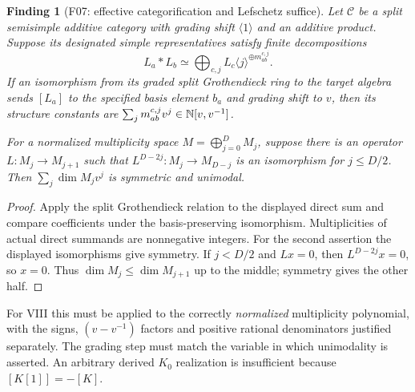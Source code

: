 \documentclass[11pt,a4paper]{article}
\newcommand{\mathscr}{\mathcal}
\newcommand{\fid}[1]{\textsf{#1}}\newcommand{\gate}[1]{\textsf{#1}}
\theoremstyle{named}\newtheorem{finding}{Finding}[section]
\theoremstyle{definition}\newtheorem{definition}[finding]{Definition}
\theoremstyle{remark}\newtheorem{remark}[finding]{Remark}
\begin{document}
\begin{finding}[\fid{F07}: effective categorification and Lefschetz suffice]\label{f:category}
Let $\mathscr C$ be a split semisimple additive category with grading shift $\langle1\rangle$ and an additive product. Suppose its designated simple representatives satisfy finite decompositions
\[
 L_a*L_b\simeq\bigoplus_{c,j}L_c\langle j\rangle^{\oplus m_{ab}^{c,j}}.
\]
If an isomorphism from its graded split Grothendieck ring to the target algebra sends $[L_a]$ to the \emph{specified} basis element $b_a$ and grading shift to $v$, then its structure constants are
$\sum_jm_{ab}^{c,j}v^j\in\mathbb N[v,v^{-1}]$.

For a normalized multiplicity space $M=\bigoplus_{j=0}^D M_j$, suppose there is an operator $L:M_j\to M_{j+1}$ such that
$L^{D-2j}:M_j\to M_{D-j}$ is an isomorphism for $j\le D/2$. Then $\sum_j\dim M_jv^j$ is symmetric and unimodal.
\end{finding}
\begin{proof}
Apply the split Grothendieck relation to the displayed direct sum and compare coefficients under the basis-preserving isomorphism. Multiplicities of actual direct summands are nonnegative integers. For the second assertion the displayed isomorphisms give symmetry. If $j<D/2$ and $Lx=0$, then $L^{D-2j}x=0$, so $x=0$. Thus $\dim M_j\le\dim M_{j+1}$ up to the middle; symmetry gives the other half.
\end{proof}
For VIII this must be applied to the correctly \emph{normalized} multiplicity polynomial, with the signs, $(v-v^{-1})$ factors and positive rational denominators justified separately. The grading step must match the variable in which unimodality is asserted. An arbitrary derived $K_0$ realization is insufficient because $[K[1]]=-[K]$.
\end{document}
